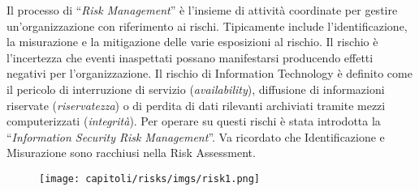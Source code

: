 Il processo di ``\textit{Risk Management}'' è l'insieme di attività coordinate
per gestire un'organizzazione con riferimento ai rischi.
Tipicamente include l'identificazione, la misurazione e la mitigazione delle
varie esposizioni al rischio.
Il rischio è l'incertezza che eventi inaspettati possano manifestarsi producendo
effetti negativi per l'organizzazione.
Il rischio di Information Technology è definito come il pericolo di interruzione
di servizio (\textit{availability}), diffusione di informazioni riservate
(\textit{riservatezza}) o di perdita di dati rilevanti
archiviati tramite mezzi computerizzati (\textit{integrità}).
Per operare su questi rischi è stata introdotta la
``\textit{Information Security Risk Management}''.
Va ricordato che Identificazione e Misurazione sono racchiusi nella
Risk Assessment.

\begin{figure}[H]
    \centering
    \texttt{[image: capitoli/risks/imgs/risk1.png]}
\end{figure}